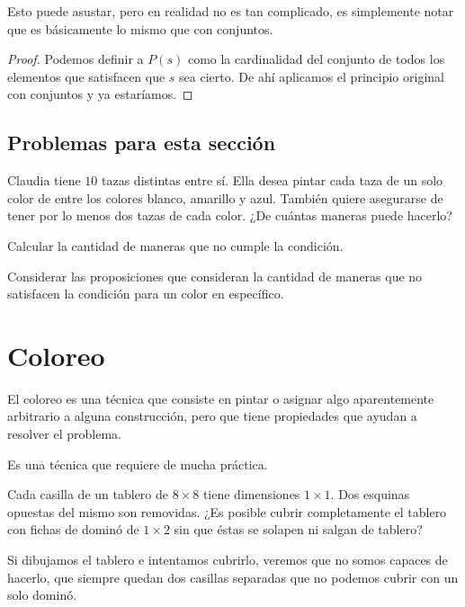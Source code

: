 Esto puede asustar, pero en realidad no es tan complicado,
es simplemente notar que es básicamente lo mismo que
con conjuntos.

\begin{proof}
	Podemos definir a $P(s)$ como
	la cardinalidad del conjunto
	de todos los elementos que satisfacen que $s$
	sea cierto. De ahí aplicamos el principio
	original con conjuntos y ya estaríamos.
\end{proof}

\subsection*{Problemas para esta sección}
\begin{problem} %
\label{problem:omapa2025-5}
Claudia tiene $10$ tazas distintas entre sí. Ella desea pintar cada taza de un
solo color de entre los colores blanco, amarillo y azul. También quiere
asegurarse de tener por lo menos dos tazas de cada color. ¿De cuántas maneras
puede hacerlo?
\begin{hints}
	\begin{hint}
		Calcular la cantidad
		de maneras que no cumple la condición.
	\end{hint}

	\begin{hint}
		Considerar las proposiciones que consideran
		la cantidad de maneras que no satisfacen la
		condición para un color en específico.
	\end{hint}
\end{hints}
\end{problem}

\section{Coloreo}
El coloreo es una técnica que
consiste en pintar o asignar algo
aparentemente arbitrario a alguna
construcción, pero que tiene propiedades
que ayudan a resolver el problema.

Es una técnica que requiere de mucha práctica.

\begin{example}
	Cada casilla de un tablero
	de $8 \times 8$ tiene dimensiones $1 \times 1$.
	Dos esquinas opuestas del mismo
	son removidas. ¿Es
	posible cubrir completamente el tablero con
	fichas de dominó de $1 \times 2$ sin que éstas
	se solapen ni salgan de tablero?
\end{example}
Si dibujamos el tablero e intentamos
cubrirlo, veremos que no
somos capaces de hacerlo, que siempre
quedan dos casillas separadas que
no podemos cubrir con un solo dominó.

